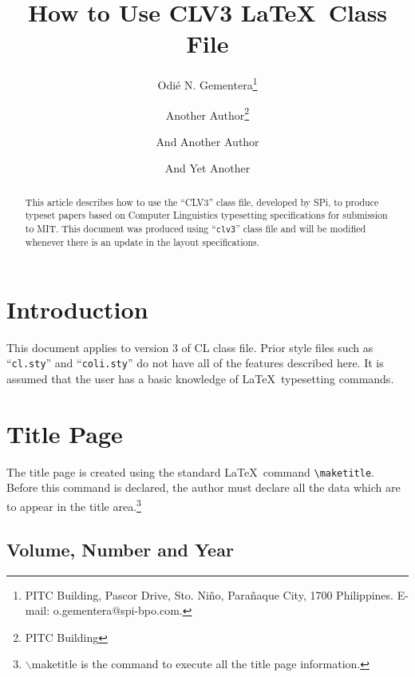 \documentclass{clv3}
\begin{document}
\title{How to Use CLV3 \LaTeX\ Class File}

\author{Odi\'e N. Gementera\thanks{PITC Building, Pascor Drive, Sto. Ni\~no, Para\~naque City, 1700 Philippines. E-mail: o.gementera@spi-bpo.com.}}

\author{Another Author\thanks{PITC Building}}

\author{And Another Author}

\author{And Yet Another}

\maketitle

\begin{abstract}
This article describes how to use the ``CLV3'' class file, developed by {\sf SPi}, 
to produce typeset papers based on Computer Linguistics typesetting specifications 
for submission to MIT. This document was produced using ``{\tt clv3}'' class file 
and will be modified whenever there is an update in the layout specifications.
\end{abstract}

\section{Introduction}

This document applies to version 3 of CL class file. Prior style files such as 
``{\tt cl.sty}'' and ``{\tt coli.sty}'' do not have all of the features 
described here. It is assumed that the user has a basic knowledge of \LaTeX\ 
typesetting commands.

\section{Title Page}

The title page is created using the standard \LaTeX\ command \verb|\maketitle|. 
Before this command is declared, the author must declare all the data which are 
to appear in the title area.\footnote{$\backslash$maketitle is the command to execute all the title page information.}

\subsection{Volume, Number and Year}
\end{document}
